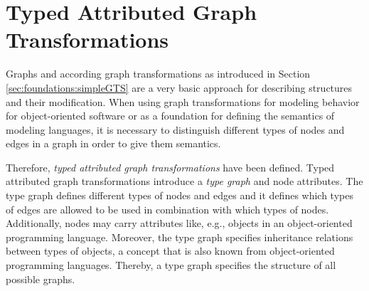 \section{Typed Attributed Graph Transformations}
\label{sec:foundations:typedAttrGTS}

Graphs and according graph transformations as introduced in Section \ref{sec:foundations:simpleGTS} are a very basic approach for describing structures and their modification.
When using graph transformations for modeling behavior for object-oriented software or as a foundation for defining the semantics of modeling languages,
it is necessary to distinguish different types of nodes and edges in a graph in order to give them semantics.

Therefore, \emph{typed attributed graph transformations} \cite{EEPT06} have been defined.
Typed attributed graph transformations introduce a \emph{type graph} and node attributes.
The type graph defines different types of nodes and edges and it defines which types of edges are allowed to be used in combination with which types of nodes.
Additionally, nodes may carry attributes like, e.g., objects in an object-oriented programming language.
Moreover, the type graph specifies inheritance relations between types of objects, a concept that is also known from object-oriented programming languages. Thereby, a type graph specifies the structure of all possible graphs.

